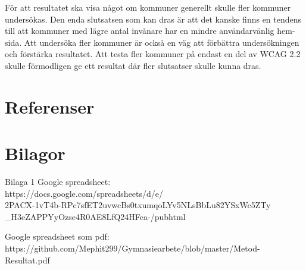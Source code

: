 \documentclass[11p]{article}
\begin{document}
\begin{otherlanguage}{swedish}

    För att resultatet ska visa något om kommuner generellt skulle fler kommuner undersökas.
    Den enda slutsatsen som kan dras är att det kanske finns en tendens till att kommuner med lägre antal invånare har en mindre användarvänlig hemsida.
    Att undersöka fler kommuner är också en väg att förbättra undersökningen och förstärka resultatet.
    Att testa fler kommuner på endast en del av WCAG 2.2 skulle förmodligen ge ett resultat där fler slutsatser skulle kunna dras.

    \newpage
    \section{Referenser}

    \printbibliography[heading=none]

    \newpage
    \section{Bilagor}
    Bilaga 1
    Google spreadsheet:
    \\ https://docs.google.com/spreadsheets/d/e/
    \\2PACX-1vT4b-RPc7sfET2uvwcBs0txumqoLYv5NLsBbLu82YSxWc5ZTy
    \\\_H3eZAPPYyOzse4R0AE8LfQ24HFca-/pubhtml

    Google spreadsheet som pdf:
    \\https://github.com/Mephit299/Gymnasiearbete/blob/master/Metod-Resultat.pdf

    \end{otherlanguage}
\end{document}
